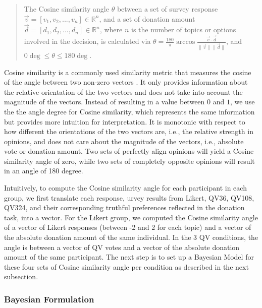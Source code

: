 \begin{quote}
    The Cosine similarity angle $\theta$ between a set of survey response $\vec{v} = [v_1, v_2, ..., v_n] \in \mathbb{R}^n$, and a set of donation amount $\vec{d} = [d_1, d_2, ..., d_n] \in \mathbb{R}^n$, where $n$ is the number of topics or options involved in the decision, is calculated via $\theta = \frac{180}{\pi} \arccos{\frac{\vec{v} \cdot \vec{d}}{\|\vec{v}\| \|\vec{d}\|}}$, and $0\deg \leq \theta \leq 180\deg$.
\end{quote}

Cosine similarity is a commonly used similarity metric 
that measures the cosine of the angle 
between two non-zero vectors \cite{singhal2001modern}. 
It only provides information about 
the relative orientation 
of the two vectors and 
does not take into account 
the magnitude of the vectors. 
Instead of resulting in a value between $0$ and $1$,
we use the the angle degree for Cosine similarity,
which represents the same information 
but provides more intuition for interpretation.
It is monotonic with respect to 
how different the orientations of the two vectors are,
i.e., the relative strength in opinions, 
and does not care about the magnitude of the vectors, 
i.e., absolute vote or donation amount. 
Two sets of perfectly align opinions 
will yield a Cosine similarity angle of zero, 
while two sets of completely opposite opinions 
will result in an angle of 180 degree.

Intuitively,
to compute the Cosine similarity angle 
for each participant in each group,
we first translate each response,
urvey results from Likert, QV36, QV108, QV324, and 
their corresponding truthful preferences 
reflected in the donation task,
into a vector.
For the Likert group, 
we computed the Cosine similarity angle of a vector 
of Likert responses (between -2 and 2 for each topic) and 
a vector of the absolute donation amount of the same individual. 
In the 3 QV conditions, 
the angle is between a vector of QV votes and 
a vector of the absolute donation amount of the same participant. 
The next step is to set up a Bayesian Model 
for these four sets of Cosine similarity angle 
per condition as described in the next subsection.


\subsubsection{Bayesian Formulation}

